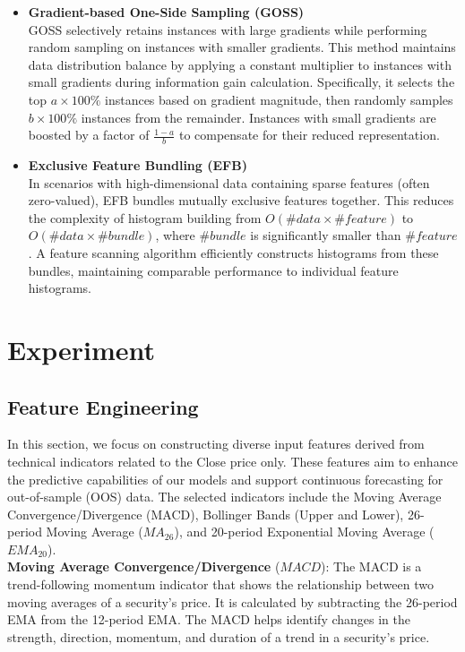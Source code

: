 \documentclass{ieeeojies}
\begin{document}
\begin{itemize}
    \item \textbf{Gradient-based One-Side Sampling (GOSS)}\\
          GOSS selectively retains instances with large gradients while performing random sampling on instances with smaller gradients. This method maintains data distribution balance by applying a constant multiplier to instances with small gradients during information gain calculation. Specifically, it selects the top \(a \times 100\%\) instances based on gradient magnitude, then randomly samples \(b \times 100\%\) instances from the remainder. Instances with small gradients are boosted by a factor of \(\frac{1-a}{b}\) to compensate for their reduced representation.\\
    \item \textbf{Exclusive Feature Bundling (EFB)}\\
          In scenarios with high-dimensional data containing sparse features (often zero-valued), EFB bundles mutually exclusive features together. This reduces the complexity of histogram building from \(O(\#data \times \#feature)\) to \(O(\#data \times \#bundle)\), where \(\#bundle\) is significantly smaller than \(\#feature\). A feature scanning algorithm efficiently constructs histograms from these bundles, maintaining comparable performance to individual feature histograms.
\end{itemize}


\section{Experiment}
\subsection{Feature Engineering}
In this section, we focus on constructing diverse input features derived from technical indicators related to the Close price only. These features aim to enhance the predictive capabilities of our models and support continuous forecasting for out-of-sample (OOS) data. The selected indicators include the Moving Average Convergence/Divergence (MACD), Bollinger Bands (Upper and Lower), 26-period Moving Average (\(MA_{26}\)), and 20-period Exponential Moving Average (\(EMA_{20}\)).
\\
\textbf{Moving Average Convergence/Divergence} (\(MACD\)): The MACD is a trend-following momentum indicator that shows the relationship between two moving averages of a security’s price. It is calculated by subtracting the 26-period EMA from the 12-period EMA. The MACD helps identify changes in the strength, direction, momentum, and duration of a trend in a security’s price.
\end{document}
